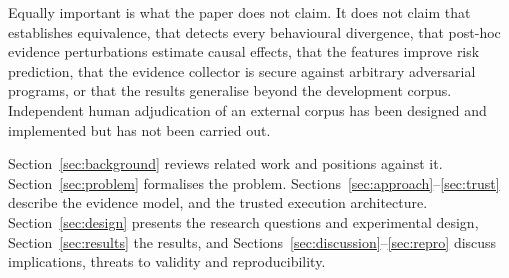 Equally important is what the paper does not claim. It does not claim that \NDO{} establishes equivalence, that \sbg{} detects every behavioural divergence, that post-hoc evidence perturbations estimate causal effects, that the \ers{} features improve risk prediction, that the evidence collector is secure against arbitrary adversarial programs, or that the results generalise beyond the development corpus. Independent human adjudication of an external corpus has been designed and implemented but has not been carried out.

Section~\ref{sec:background} reviews related work and positions \sbg{} against it. Section~\ref{sec:problem} formalises the problem. Sections~\ref{sec:approach}--\ref{sec:trust} describe the evidence model, \ers{} and the trusted execution architecture. Section~\ref{sec:design} presents the research questions and experimental design, Section~\ref{sec:results} the results, and Sections~\ref{sec:discussion}--\ref{sec:repro} discuss implications, threats to validity and reproducibility.
